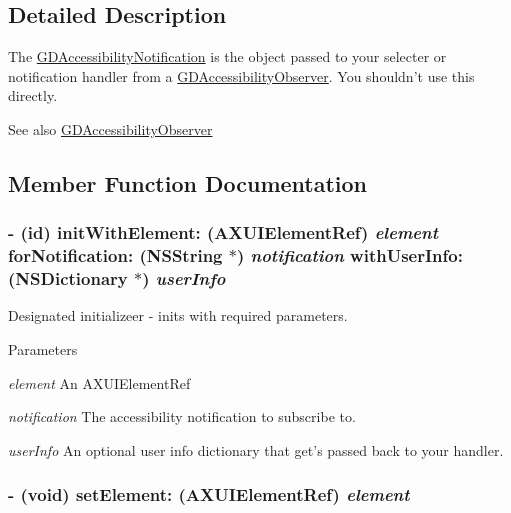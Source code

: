 \subsection{Detailed Description}
The \hyperlink{interface_g_d_accessibility_notification}{GDAccessibilityNotification} is the object passed to your selecter or notification handler from a \hyperlink{interface_g_d_accessibility_observer}{GDAccessibilityObserver}. You shouldn't use this directly.

\begin{DoxySeeAlso}{See also}
\hyperlink{interface_g_d_accessibility_observer}{GDAccessibilityObserver} 
\end{DoxySeeAlso}


\subsection{Member Function Documentation}
\hypertarget{interface_g_d_accessibility_notification_a79fa1997f1e26f0f63f4b2e16ec4a7b8}{
\subsubsection[{initWithElement:forNotification:withUserInfo:}]{\setlength{\rightskip}{0pt plus 5cm}-\/ (id) initWithElement: (AXUIElementRef) {\em element}\/ forNotification: (NSString $\ast$) {\em notification}\/ withUserInfo: (NSDictionary $\ast$) {\em userInfo}}}
\label{interface_g_d_accessibility_notification_a79fa1997f1e26f0f63f4b2e16ec4a7b8}


Designated initializeer -\/ inits with required parameters. 
\begin{DoxyParams}{Parameters}
\item[{\em element}]An AXUIElementRef \item[{\em notification}]The accessibility notification to subscribe to. \item[{\em userInfo}]An optional user info dictionary that get's passed back to your handler. \end{DoxyParams}
\hypertarget{interface_g_d_accessibility_notification_a2dcdd48bb0572d48810026fed1577b9c}{
\subsubsection[{setElement:}]{\setlength{\rightskip}{0pt plus 5cm}-\/ (void) setElement: (AXUIElementRef) {\em element}}}
\label{interface_g_d_accessibility_notification_a2dcdd48bb0572d48810026fed1577b9c}


